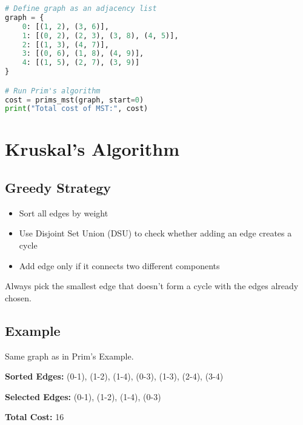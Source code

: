 \documentclass[14pt]{extarticle}
\begin{document}
\begin{lstlisting}[language=Python]
# Define graph as an adjacency list
graph = {
    0: [(1, 2), (3, 6)],
    1: [(0, 2), (2, 3), (3, 8), (4, 5)],
    2: [(1, 3), (4, 7)],
    3: [(0, 6), (1, 8), (4, 9)],
    4: [(1, 5), (2, 7), (3, 9)]
}

# Run Prim's algorithm
cost = prims_mst(graph, start=0)
print("Total cost of MST:", cost)
\end{lstlisting}

\newpage

\section*{Kruskal's Algorithm}

\subsection*{Greedy Strategy}

\begin{itemize}
    \item Sort all edges by weight
    \item Use Disjoint Set Union (DSU) to check whether adding an edge creates a cycle
    \item Add edge only if it connects two different components
\end{itemize}

\begin{tcolorbox}[colback=white, colframe=black, title=Key Idea]
Always pick the smallest edge that doesn’t form a cycle with the edges already chosen.
\end{tcolorbox}

\subsection*{Example}

Same graph as in Prim’s Example.

\textbf{Sorted Edges:}  
(0-1), (1-2), (1-4), (0-3), (1-3), (2-4), (3-4)

\textbf{Selected Edges:}  
(0-1), (1-2), (1-4), (0-3)

\textbf{Total Cost:} 16

\newpage
\end{document}

